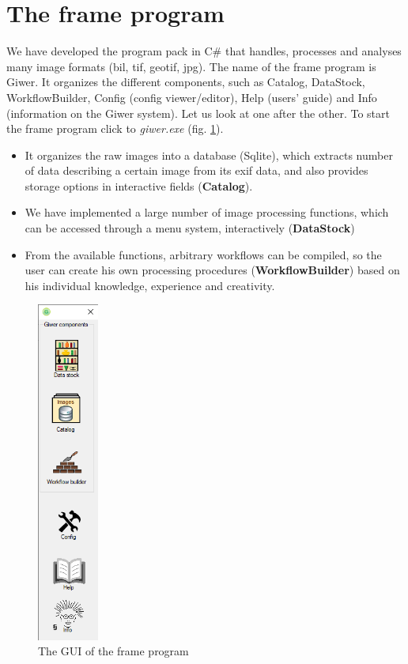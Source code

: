 \documentclass[a4paper,12pt]{article}
\begin{document}
\section{The frame program}

We have developed the program pack in C\# that handles, processes and analyses many image formats (bil, tif, geotif, jpg).
The name of the frame program is Giwer.  It organizes the different components, such as Catalog, DataStock, WorkflowBuilder, Config (config viewer/editor), Help (users’ guide) and Info (information on the Giwer system).  Let us look at one after the other. To start the frame program click to \textit{giwer.exe} (fig. \ref{fig:giwerMain}).


\begin{itemize}
	\item It organizes the raw images into a database (Sqlite), which extracts number of data describing a certain image from its exif data, and also provides storage options in interactive fields (\textbf{Catalog}).
	\item We have implemented a large number of image processing functions, which can be accessed through a menu system, interactively (\textbf{DataStock})
	\item From the available functions, arbitrary workflows can be compiled, so the user can create his own processing procedures (\textbf{WorkflowBuilder}) based on his individual knowledge, experience and creativity.
\end{itemize}

	\begin{figure}
	\centering
	\includegraphics[width=2cm]{giwerMain.png}
	\caption{The GUI of the frame program}
	\label{fig:giwerMain}
\end{figure}
\end{document}
